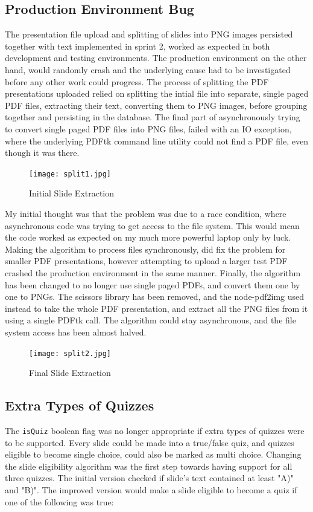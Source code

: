 \subsection{Production Environment Bug}
The presentation file upload and splitting of slides into PNG images persisted
together with text implemented in sprint 2, worked as expected in both development and testing environments.
The production environment on the other hand, would randomly crash and the underlying cause had
to be investigated before any other work could progress. The process of splitting the
PDF presentations uploaded relied on splitting the intial file into separate, single
paged PDF files, extracting their text, converting them to PNG images, before grouping
together and persisting in the database. The final part of asynchronously trying
to convert single paged PDF files into PNG files, failed with an IO exception, where
the underlying PDFtk\cite{55} command line utility could not find a PDF file, even though it was
there.

\begin{figure}[h!]
    \centering
    \texttt{[image: split1.jpg]}
    \caption{Initial Slide Extraction}
    \label{fig:split1}
\end{figure}

\newpage
My initial thought was that the problem was due to a race condition, where asynchronous
code was trying to get access to the file system. This would mean the code worked as expected
on my much more powerful laptop only by luck. Making the algorithm to process
files synchronously, did fix the problem for smaller PDF presentations, however attempting
to upload a larger test PDF crashed the production environment in the same manner.
Finally, the algorithm has been changed to no longer use single paged PDFs, and convert them
one by one to PNGs. The scissors library has been removed, and the node-pdf2img\cite{56} used
instead to take the whole PDF presentation, and extract all the PNG files from it using a
single PDFtk call. The algorithm could stay asynchronous, and the file system access has been almost halved.

\begin{figure}[h!]
    \centering
    \texttt{[image: split2.jpg]}
    \caption{Final Slide Extraction}
    \label{fig:split2}
\end{figure}

\newpage
\subsection{Extra Types of Quizzes}
The \texttt{isQuiz} boolean flag was no longer appropriate if extra types of quizzes were
to be supported. Every slide could be made into a true/false quiz, and quizzes eligible
to become single choice, could also be marked as multi choice. Changing the slide eligibility
algorithm was the first step towards having support for all three quizzes. The initial version
checked if slide's text contained at least "A)" and "B)". The improved version would make a
slide eligible to become a quiz if one of the following was true:

